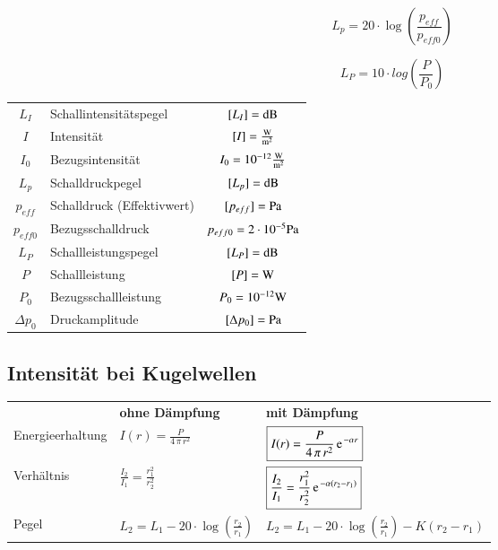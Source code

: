 \begin{minipage}{0.28\linewidth}
	$$ \boxed{ L_p = 20 \cdot \log \left( \frac{p_{eff}}{p_{eff0}} \right) } $$ 
\end{minipage}
\hfill
\begin{minipage}{0.28\linewidth}
	$$ \boxed{ L_P = 10 \cdot log \left(\frac{P}{P_0}\right)} $$ 
\end{minipage}

\renewcommand{\arraystretch}{1.3}
\begin{tabular}{clc}
	$L_I$ & Schallintensitätspegel & $[L_I] = \mathrm{dB}$ \\
	$I$ & Intensität & $[I] = \frac{\mathrm{W}}{\mathrm{m}^2}$\\
	$I_0$ & Bezugsintensität  & $I_0 = 10^{-12} \frac{\mathrm{W}}{\mathrm{m}^2}$ \\
	$L_p$ & Schalldruckpegel & $[L_p] = \mathrm{dB}$ \\
	$p_{eff}$ & Schalldruck (Effektivwert) & $[p_{eff}] = \mathrm{Pa}$ \\
	$p_{eff0}$ & Bezugsschalldruck & $p_{eff0} = 2 \cdot 10^{-5} \mathrm{Pa}$ \\
	$L_P$ & Schallleistungspegel & $[L_P] = \mathrm{dB}$ \\
	$P$ & Schallleistung & $[P] = \mathrm{W}$ \\
	$P_0$ & Bezugsschallleistung & $P_0 = 10^{-12} \mathrm{W}$ \\
	$\Delta p_0$ & Druckamplitude & $[\Delta p_0] = \mathrm{Pa}$ \\
\end{tabular}
\renewcommand{\arraystretch}{1}

\subsection{Intensität bei Kugelwellen}
\begin{tabular}{lll}
					 & \textbf{ohne Dämpfung} & \textbf{mit Dämpfung} \\
	Energieerhaltung & $ \boxed{ I(r) = \frac{P}{4 \, \pi \, r^2} }$ & $ \boxed{ I(r) = \frac{P}{4 \, \pi \, r^2} \, \e^{- \alpha r}}$\\

	Verhältnis 		 & $\boxed{ \frac{I_2}{I_1} = \frac{r_1^2}{r_2^2} }$ & $\boxed{ \frac{I_2}{I_1} = \frac{r_1^2}{r_2^2} \, \e^{- \alpha (r_2 - r_1)} }$ \\

	Pegel 			 & $\boxed{ L_2 = L_1 - 20 \cdot \log \left( \frac{r_2}{r_1} \right)}$ & $\boxed{ L_2 = L_1 - 20 \cdot \log \left( \frac{r_2}{r_1} \right) - K (r_2 - r_1)  }$\\
\end{tabular}


